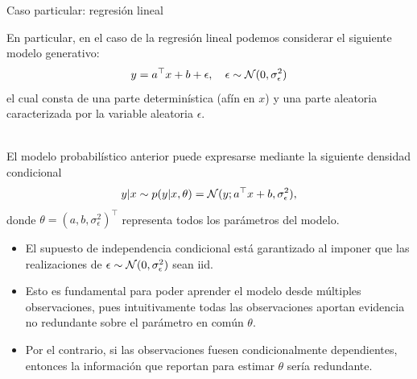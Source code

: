 \documentclass[9pt]{beamer}
\begin{document}
\begin{frame}{Caso particular: regresión lineal}
	
En particular, en el caso de la regresión lineal podemos considerar el siguiente modelo  generativo:
\begin{equation*}
	y = a^\top x + b + \epsilon,\quad \epsilon\sim{\mathcal N}(0,\sigma_\epsilon^2)
\end{equation*}
el cual consta de una parte determinística (afín en $x$) y una parte aleatoria caracterizada por la variable aleatoria $\epsilon$.\\~\ \pause

El modelo probabilístico anterior puede expresarse mediante la siguiente densidad condicional 
\begin{equation*}
	y|x \sim p(y|x,\theta) = {\mathcal N}(y;a^\top x + b ,\sigma_\epsilon^2),\label{eq:mod_lin_gau}
\end{equation*}
donde $\theta=(a,b,\sigma_\epsilon^2)^\top$ representa todos los parámetros del modelo. \pause

\begin{itemize}
	\item El supuesto de independencia condicional está garantizado al imponer que las realizaciones de $\epsilon\sim{\mathcal N}(0,\sigma_\epsilon^2)$ sean iid.\pause
	\item  Esto es  fundamental para poder aprender el modelo desde múltiples observaciones, pues intuitivamente todas las observaciones aportan evidencia no redundante sobre el parámetro en común $\theta$.\pause
	\item  Por el contrario, si las observaciones fuesen condicionalmente dependientes, entonces la información que reportan para estimar $\theta$ sería redundante.
\end{itemize}
	
\end{frame}
\end{document}
